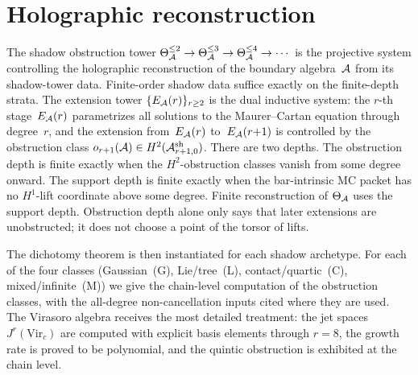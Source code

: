 
\section{Holographic reconstruction}
\label{ch:thqg-holographic-reconstruction}%

The shadow obstruction tower
$\Theta_{\mathcal{A}}^{\leq 2} \to \Theta_{\mathcal{A}}^{\leq 3} \to
\Theta_{\mathcal{A}}^{\leq 4} \to \cdots$
is the projective system controlling the holographic
reconstruction of the boundary algebra~$\mathcal{A}$ from its
shadow-tower data. Finite-order shadow data suffice exactly on the
finite-depth strata. The extension tower
$\{E_{\mathcal{A}}(r)\}_{r \geq 2}$ is the dual inductive system: the
$r$-th stage~$E_{\mathcal{A}}(r)$ parametrizes all solutions to
the Maurer--Cartan equation through degree~$r$, and the
extension from~$E_{\mathcal{A}}(r)$ to~$E_{\mathcal{A}}(r{+}1)$ is
controlled by the obstruction class
$o_{r+1}(\mathcal{A}) \in H^2(\mathcal{A}^{\mathrm{sh}}_{r+1,0})$.
There are two depths.  The obstruction depth is finite exactly when
the \(H^2\)-obstruction classes vanish from some degree onward.  The
support depth is finite exactly when the bar-intrinsic MC packet has no
\(H^1\)-lift coordinate above some degree.  Finite reconstruction of
\(\Theta_{\mathcal{A}}\) uses the support depth.  Obstruction depth alone only
says that later extensions are unobstructed; it does not choose a point
of the torsor of lifts.

The dichotomy theorem is then instantiated for each shadow
archetype. For each of the four classes (Gaussian~(G),
Lie/tree~(L), contact/quartic~(C), mixed/infinite~(M)) we
give the chain-level computation of the obstruction classes,
with the all-degree non-cancellation inputs cited where they are used.
The Virasoro algebra receives
the most detailed treatment: the jet spaces
$J^r(\mathrm{Vir}_c)$ are computed with explicit basis
elements through $r = 8$, the growth rate is proved to be
polynomial, and the quintic obstruction is exhibited at
the chain level.

